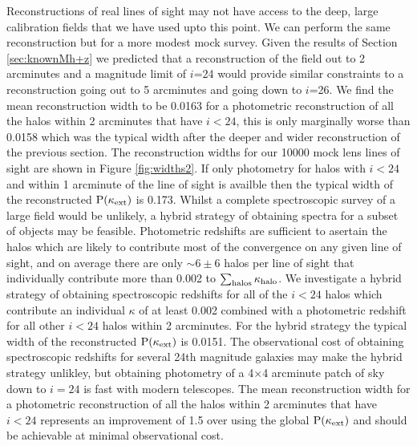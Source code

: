 \documentclass[useAMS,usenatbib]{mn2e}
\begin{document}
Reconstructions of real lines of sight may not have access to the deep, large calibration fields that we have used upto this point. We can perform the same reconstruction but for a more modest mock survey. Given the results of Section \ref{sec:knownMh+z} we predicted that a reconstruction of the field out to 2 arcminutes and a magnitude limit of $i$=24 would provide similar constraints to a reconstruction going out to 5 arcminutes and going down to $i$=26. We find the mean reconstruction width to be 0.0163 for a photometric reconstruction of all the halos within 2 arcminutes that have $i<24$, this is only marginally worse than 0.0158 which was the typical width after the deeper and wider reconstruction of the previous section. The reconstruction widths for our 10000 mock lens lines of sight are shown in Figure \ref{fig:widths2}. If only photometry for halos with $i<24$ and within 1 arcminute of the line of sight is availble then the typical width of the reconstructed ${\rm P}(\kappa_{\rm ext})$ is 0.173. Whilst a complete spectroscopic survey of a large field would be unlikely, a hybrid strategy of obtaining spectra for a subset of objects may be feasible. Photometric redshifts are sufficient to asertain the halos which are likely to contribute most of the convergence on any given line of sight, and on average there are only $\sim 6 \pm 6$ halos per line of sight that individually contribute more than 0.002 to $\sum_{\rm halos} \kappa_{\rm halo}$. We investigate a hybrid strategy of obtaining spectroscopic redshifts for all of the $i<24$ halos which contribute an individual $\kappa$ of at least 0.002 combined with a photometric redshift for all other $i<24$ halos within 2 arcminutes. For the hybrid strategy the typical width of the reconstructed ${\rm P}(\kappa_{\rm ext})$ is 0.0151. The observational cost of obtaining spectroscopic redshifts for several 24th magnitude galaxies may make the hybrid strategy unlikley, but obtaining photometry of a 4$\times$4 arcminute patch of sky down to $i=24$ is fast with modern telescopes. The mean reconstruction width for a photometric reconstruction of all the halos within 2 arcminutes that have $i<24$ represents an improvement of 1.5 over using the global ${\rm P}(\kappa_{\rm ext})$ and should be achievable at minimal observational cost.

\end{document}

